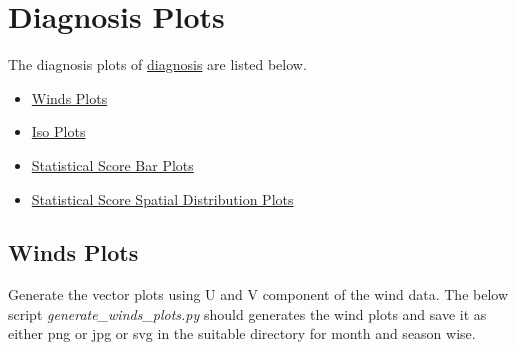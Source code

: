 \documentclass[letterpaper,10pt,english]{sphinxmanual}
\begin{document}
\section{Diagnosis Plots}
\label{diagnosis:diagnosis-plots}
The diagnosis plots of {\hyperref[diagnosis:diagnosis]{diagnosis}} are listed below.
\begin{itemize}
\item {} 
{\hyperref[diagnosis:winds-plots]{Winds Plots}}

\item {} 
{\hyperref[diagnosis:iso-plots]{Iso Plots}}

\item {} 
{\hyperref[diagnosis:statistical-score-bar-plots]{Statistical Score Bar Plots}}

\item {} 
{\hyperref[diagnosis:statistical-score-spatial-distribution-plots]{Statistical Score Spatial Distribution Plots}}

\end{itemize}


\subsection{Winds Plots}
\label{diagnosis:winds-plots}
Generate the vector plots using U and V component of the wind data.
The below script \emph{generate\_winds\_plots.py} should generates the wind plots and save it as either png or jpg or svg in the suitable directory for month and season wise.
\label{diagnosis:module-generate_winds_plots}
\end{document}
